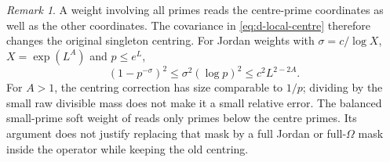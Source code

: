 \documentclass[11pt]{article}
\theoremstyle{definition}
\theoremstyle{remark}
\newtheorem{remark}[theorem]{Remark}
\numberwithin{equation}{section}
\begin{document}
\begin{remark}\label{rem:d-jordan-mask}
A weight involving all primes reads the centre-prime coordinates as well as the other coordinates.
The covariance in \eqref{eq:d-local-centre} therefore changes the original singleton centring.
For Jordan weights with $\sigma=c/\log X$, $X=\exp(L^A)$ and $p\le e^L$,
\begin{equation}\label{eq:d-small-jordan}
 (1-p^{-\sigma})^2\le\sigma^2(\log p)^2\le c^2L^{2-2A}.
\end{equation}
For $A>1$, the centring correction has size comparable to $1/p$; dividing by the small raw divisible
mass does not make it a small relative error.
The balanced small-prime soft weight of \cite[Theorem~1.3]{Guo2026RoughPairsFixedDistance} reads only
primes below the centre primes. Its argument does not justify replacing that mask by a full Jordan or
full-$\Omega$ mask inside the operator while keeping the old centring.
\end{remark}
\end{document}
